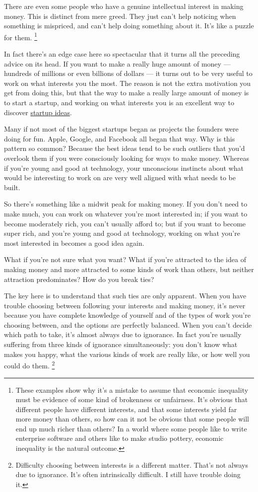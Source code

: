 \documentclass[12pt]{book}
\begin{document}
There are even some people who have a genuine intellectual interest in
making money. This is distinct from mere greed. They just can't help
noticing when something is mispriced, and can't help doing something
about it. It's like a puzzle for them. \footnote{These examples show why it's a mistake to assume that economic
inequality must be evidence of some kind of brokenness or unfairness.
It's obvious that different people have different interests, and that
some interests yield far more money than others, so how can it not be
obvious that some people will end up much richer than others? In a world
where some people like to write enterprise software and others like to
make studio pottery, economic inequality is the natural outcome.}

In fact there's an edge case here so spectacular that it turns all the
preceding advice on its head. If you want to make a really huge amount
of money --- hundreds of millions or even billions of dollars --- it
turns out to be very useful to work on what interests you the most. The
reason is not the extra motivation you get from doing this, but that the
way to make a really large amount of money is to start a startup, and
working on what interests you is an excellent way to discover
\href{startupideas.html}{startup ideas}.

Many if not most of the biggest startups began as projects the founders
were doing for fun. Apple, Google, and Facebook all began that way. Why
is this pattern so common? Because the best ideas tend to be such
outliers that you'd overlook them if you were consciously looking for
ways to make money. Whereas if you're young and good at technology, your
unconscious instincts about what would be interesting to work on are
very well aligned with what needs to be built.

So there's something like a midwit peak for making money. If you don't
need to make much, you can work on whatever you're most interested in;
if you want to become moderately rich, you can't usually afford to; but
if you want to become super rich, and you're young and good at
technology, working on what you're most interested in becomes a good
idea again.

What if you're not sure what you want? What if you're attracted to the
idea of making money and more attracted to some kinds of work than
others, but neither attraction predominates? How do you break ties?

The key here is to understand that such ties are only apparent. When you
have trouble choosing between following your interests and making money,
it's never because you have complete knowledge of yourself and of the
types of work you're choosing between, and the options are perfectly
balanced. When you can't decide which path to take, it's almost always
due to ignorance. In fact you're usually suffering from three kinds of
ignorance simultaneously: you don't know what makes you happy, what the
various kinds of work are really like, or how well you could do them.
\footnote{Difficulty choosing between interests is a different matter.
That's not always due to ignorance. It's often intrinsically difficult.
I still have trouble doing it.}
\end{document}
